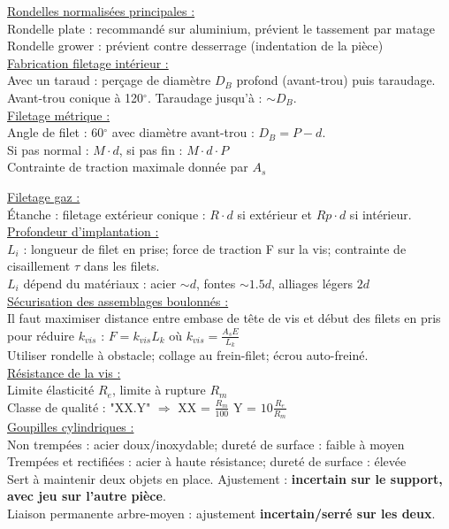 \documentclass[../main.tex]{subfiles}
\begin{document}
\quad \underline{Rondelles normalisées principales :}\\
Rondelle plate : recommandé sur aluminium, prévient le tassement par matage\\
Rondelle grower : prévient contre desserrage (indentation de la pièce)\\

\quad \underline{Fabrication filetage intérieur :}\\
Avec un taraud : perçage de diamètre $D_B$ profond (avant-trou) puis taraudage. Avant-trou conique à 120$^{\circ}$. Taraudage jusqu'à : $\sim D_B$.\\

\quad \underline{Filetage métrique :}\\
Angle de filet : 60$^{\circ}$ avec diamètre avant-trou : $D_B = P-d$.\\
Si pas normal : $M\cdot d$, si pas fin : $M\cdot d\cdot P$\\
Contrainte de traction maximale donnée par $A_s$

\quad \underline{Filetage gaz :}\\
Étanche : filetage extérieur conique : $R\cdot d$ si extérieur et $Rp\cdot d$ si intérieur.\\

\quad \underline{Profondeur d'implantation :}\\
$L_i$ : longueur de filet en prise; force de traction F sur la vis; contrainte de cisaillement $\tau$ dans les filets.\\
$L_i$ dépend du matériaux : acier $\sim d$, fontes $\sim 1.5d$, alliages légers $2d$\\

\quad \underline{Sécurisation des assemblages boulonnés :}\\
Il faut maximiser distance entre embase de tête de vis et début des filets en pris pour réduire $k_{vis}$ : $F = k_{vis} L_k$ où $k_{vis} = \frac{A_sE}{L_k}$\\
Utiliser rondelle à obstacle; collage au frein-filet; écrou auto-freiné.\\

\quad \underline{Résistance de la vis :}\\
Limite élasticité $R_e$, limite à rupture $R_m$\\
Classe de qualité : "XX.Y" $\Rightarrow$ XX = $\frac{R_m}{100}$ Y = $10\frac{R_e}{R_m}$\\


\quad \underline{Goupilles cylindriques :}\\
Non trempées : acier doux/inoxydable; dureté de surface : faible à moyen\\
Trempées et rectifiées : acier à haute résistance; dureté de surface : élevée\\
Sert à maintenir deux objets en place. Ajustement : \textbf{incertain sur le support, avec jeu sur l'autre pièce}.\\
Liaison permanente arbre-moyen : ajustement \textbf{incertain/serré sur les deux}.\\
\end{document}
